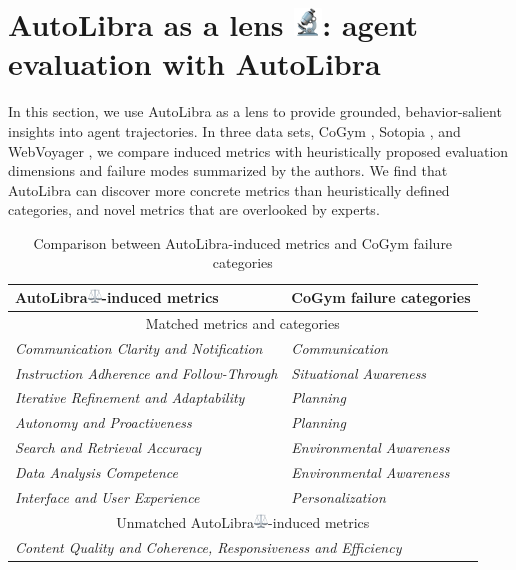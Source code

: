 \section{\texorpdfstring{AutoLibra as a lens \includegraphics[height=1em]{figs/microscope.png}: agent evaluation with AutoLibra}{AutoLibra as a lens: agent evaluation with AutoLibra}}
\label{sec:lens}

In this section, we use AutoLibra as a lens to provide grounded, behavior-salient insights into agent trajectories. In three data sets, CoGym \citep{shao2024collaborative}, Sotopia \citep{zhousotopia}, and WebVoyager \citep{he2024webvoyager}, we compare induced metrics with heuristically proposed evaluation dimensions and failure modes summarized by the authors. We find that AutoLibra can discover more concrete metrics than heuristically defined categories, and novel metrics that are overlooked by experts. 

\begin{table}[!h]
\centering
\begin{tabular}{ll}
    \toprule
    AutoLibra\protect\includegraphics[height=1em]{figs/scale.png}-induced metrics & CoGym failure categories\\\midrule
    \multicolumn{2}{c}{Matched metrics and categories}\\\midrule
    \emph{Communication Clarity and Notification} & \textit{Communication} \\
    \textit{Instruction Adherence and Follow-Through} & \textit{Situational Awareness} \\
    \textit{Iterative Refinement and Adaptability} & \textit{Planning}\\
    \textit{Autonomy and Proactiveness} & \textit{Planning} \\
    \textit{Search and Retrieval Accuracy} & \textit{Environmental Awareness} \\
    \textit{Data Analysis Competence} & \textit{Environmental Awareness} \\
    \textit{Interface and User Experience} & \textit{Personalization} \\\midrule
    \multicolumn{2}{c}{Unmatched AutoLibra\protect\includegraphics[height=1em]{figs/scale.png}-induced metrics}\\\midrule
     \multicolumn{2}{C{0.8\textwidth}}{\textit{Content Quality and Coherence, Responsiveness and Efficiency}} \\ \bottomrule
\end{tabular}
\caption{Comparison between AutoLibra-induced metrics and CoGym failure categories}
\label{tab:lens_cogym}
\end{table}


